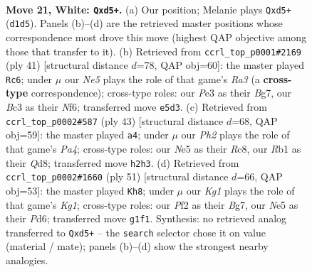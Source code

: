\documentclass[11pt]{article}
\begin{document}
\clearpage

\begin{figure}[p]\centering
\begin{subfigure}{0.46\textwidth}\centering
\resizebox{\linewidth}{!}{%
\newchessgame
\chessboard[
  setfen={rnb1q1k1/1p2r1pp/8/p2nNp2/8/2B1P1P1/P4P1P/1R1QR1K1 w - - 0 21},
  showmover=false,
  pgfstyle=straightmove, color=movearrow, markmove={d1-d5}
]}
\caption{}
\end{subfigure}\hfill
\begin{subfigure}{0.46\textwidth}\centering
\resizebox{\linewidth}{!}{%
\newchessgame
\chessboard[
  setfen={q3r1k1/5pbp/r2p1np1/p7/P2BP3/7P/3NQPP1/2R1R1K1 b - - 2 21},
  showmover=false,
  pgfstyle=straightmove, color=movearrow, markmove={a6-c6}
]}
\caption{}
\end{subfigure}
\\[4pt]
\begin{subfigure}{0.46\textwidth}\centering
\resizebox{\linewidth}{!}{%
\newchessgame
\chessboard[
  setfen={2rq1rk1/p3ppbp/6p1/p2PN3/1n3B2/5Q2/1P3PPP/3RR1K1 b - - 5 22},
  showmover=false,
  pgfstyle=straightmove, color=movearrow, markmove={a5-a4}
]}
\caption{}
\end{subfigure}\hfill
\begin{subfigure}{0.46\textwidth}\centering
\resizebox{\linewidth}{!}{%
\newchessgame
\chessboard[
  setfen={q1r3k1/r5bp/3p4/P3pp2/1B1n4/4NP2/3Q2PP/R4RK1 b - - 2 26},
  showmover=false,
  pgfstyle=straightmove, color=movearrow, markmove={g8-h8}
]}
\caption{}
\end{subfigure}
\caption{\textbf{Move 21, White: \texttt{Qxd5+}.} (a) Our position; Melanie plays \texttt{Qxd5+} (\texttt{d1d5}). Panels (b)--(d) are the retrieved master positions whose correspondence most drove this move (highest QAP objective among those that transfer to it). (b) Retrieved from \texttt{ccrl\_top\_p0001\#2169} (ply 41) [structural distance $d$=78, QAP obj=60]: the master played \texttt{Rc6}; under $\mu$ our \emph{Ne5} plays the role of that game's \emph{Ra3} (a \textbf{cross-type} correspondence); cross-type roles: our \emph{P}e3 as their \emph{B}g7, our \emph{B}c3 as their \emph{N}f6; transferred move \texttt{e5d3}. (c) Retrieved from \texttt{ccrl\_top\_p0002\#587} (ply 43) [structural distance $d$=68, QAP obj=59]: the master played \texttt{a4}; under $\mu$ our \emph{Ph2} plays the role of that game's \emph{Pa4}; cross-type roles: our \emph{N}e5 as their \emph{R}c8, our \emph{R}b1 as their \emph{Q}d8; transferred move \texttt{h2h3}. (d) Retrieved from \texttt{ccrl\_top\_p0002\#1660} (ply 51) [structural distance $d$=66, QAP obj=53]: the master played \texttt{Kh8}; under $\mu$ our \emph{Kg1} plays the role of that game's \emph{Kg1}; cross-type roles: our \emph{P}f2 as their \emph{B}g7, our \emph{N}e5 as their \emph{P}d6; transferred move \texttt{g1f1}. Synthesis: no retrieved analog transferred to \texttt{Qxd5+} -- the \texttt{search} selector chose it on value (material / mate); panels (b)--(d) show the strongest nearby analogies.}
\label{fig:thought-m40}
\end{figure}
\end{document}
